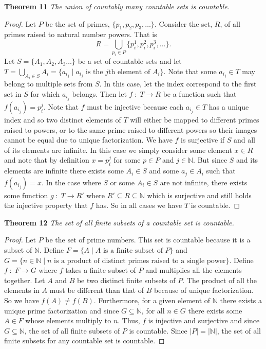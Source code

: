 \documentclass{article}
\begin{document}
\begin{flushleft}
\textbf{Theorem 11}
\textsl{The union of countably many countable sets is countable.}
\begin{proof}
Let $P$ be the set of primes, $\{p_1, p_2, p_3, \dots \}$. Consider the set, $R$, of all primes raised to natural number powers. That is
\[
R = \bigcup_{p_i \in P} \{p_i^1, p_i^2, p_i^3, \dots\}.
\]
Let $S=\{A_1, A_2, A_3 \dots \}$ be a set of countable sets and let $T = \bigcup_{A_i \in S} A_i = \{a_{i_j} \mid \text{$a_{i_j}$ is the $j$th element of $A_i$}\}$. Note that some $a_{i_j} \in T$ may belong to multiple sets from $S$. In this case, let the index correspond to the first set in $S$ for which $a_{i_j}$ belongs. Then let $f \; : \; T \rightarrow R$ be a function such that $f(a_{i_j}) = p_i^j$. Note that $f$ must be injective because each $a_{i_j} \in T$ has a unique index and so two distinct elements of $T$ will either be mapped to different primes raised to powers, or to the same prime raised to different powers so their images cannot be equal due to unique factorization. We have $f$ is surjective if $S$ and all of its elements are infinite. In this case we simply consider some element $x \in R$ and note that by definition $x = p_i^j$ for some $p \in P$ and $j \in \mathbb{N}$. But since $S$ and its elements are infinite there exists some $A_i \in S$ and some $a_j \in A_i$ such that $f(a_{i_j})=x$. In the case where $S$ or some $A_i \in S$ are not infinite, there exists some function $g \; : \; T \rightarrow R'$ where $R' \subseteq R \subseteq \mathbb{N}$ which is surjective and still holds the injective property that $f$ has. So in all cases we have $T$ is countable.
\end{proof}

\textbf{Theorem 12}
\textsl{The set of all finite subsets of a countable set is countable.}
\begin{proof}
Let $P$ be the set of prime numbers. This set is countable because it is a subset of $\mathbb{N}$. Define $F = \{A \mid \text{$A$ is a finite subset of $P$}\}$ and $G = \{n \in \mathbb{N} \mid \text{$n$ is a product of distinct primes raised to a single power}\}$. Define $f \; : \; F \rightarrow G$ where $f$ takes a finite subset of $P$ and multiplies all the elements together. Let $A$ and $B$ be two distinct finite subsets of $P$. The product of all the elements in $A$ must be different than that of $B$ because of unique factorization. So we have $f(A) \neq f(B)$. Furthermore, for a given element of $\mathbb{N}$ there exists a unique prime factorization and since $G \subseteq \mathbb{N}$, for all $n \in G$ there exists some $A \in F$ whose elements multiply to $n$. Thus, $f$ is injective and surjective and since $G \subseteq \mathbb{N}$, the set of all finite subsets of $P$ is countable. Since $|P|=|\mathbb{N}|$, the set of all finite subsets for any countable set is countable.
\end{proof}


\end{flushleft}
\end{document}

